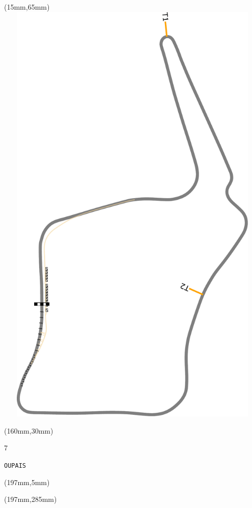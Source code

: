 \begin{textblock*}{185mm}(15mm,65mm)%
\centering
\mbox{\includegraphics[width=185mm,height=210mm,keepaspectratio]{PT/OUPAIS.pdf}}
\end{textblock*}
\begin{textblock*}{40mm}(160mm,30mm)%
\Large
\par{} 
\par7 
\par\hfill\tiny\tt OUPAIS\\
\end{textblock*}
\begin{textblock*}{20mm}(197mm,5mm)%
\fbox{\thepage}
\label{OUPAIS}
\end{textblock*}
\begin{textblock*}{20mm}(197mm,285mm)%
\fbox{\thepage}
\end{textblock*}

